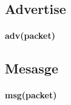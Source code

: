 \documentclass{article}
\begin{document}
\subsection{Advertise}
\paragraph{adv(packet)}
\subsection{Mesasge}
\paragraph{msg(packet)}
\clearpage
\end{document}
